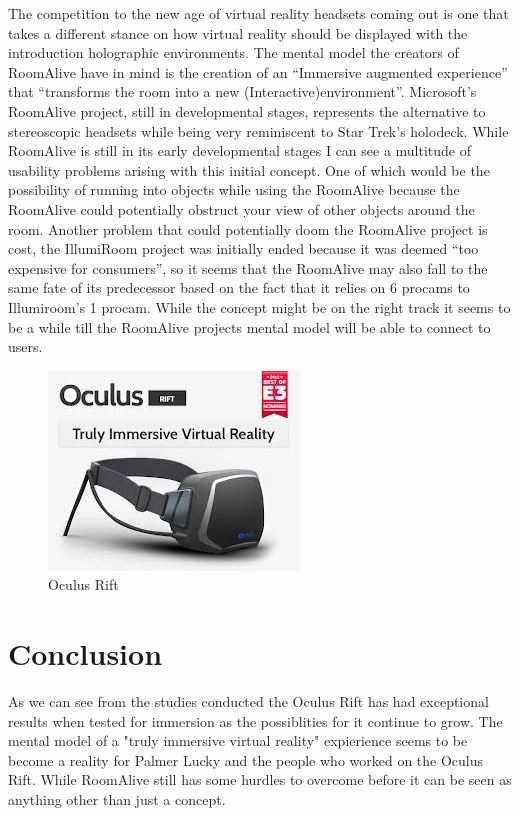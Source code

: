 \documentclass[a4paper]{article}
\begin{document}
\indent The competition to the new age of virtual reality headsets coming out is one that takes a different stance on how virtual reality should be displayed with the introduction holographic environments. The mental model the creators of RoomAlive have in mind is the creation of an “Immersive augmented experience”  that “transforms the room into a new (Interactive)environment”\cite{6}. Microsoft’s RoomAlive project, still in developmental stages, represents the alternative to stereoscopic headsets while being very reminiscent to Star Trek’s holodeck. While RoomAlive is still in its early developmental stages I can see a multitude of usability problems arising with this initial concept. One of which would be the possibility of running into objects while using the RoomAlive because the RoomAlive could potentially obstruct your view of other objects around the room. Another problem that could potentially doom the RoomAlive project is cost, the IllumiRoom project was initially ended because it was deemed “too expensive for consumers”\cite{6}, so it seems that the RoomAlive may also fall to the same fate of its predecessor based on the fact that it relies on 6 procams to Illumiroom's 1 procam. While the concept might be on the right track it seems to be a while till the RoomAlive projects mental model will be able to connect to users.


\begin{figure}
\centering
\includegraphics[scale=0.4]{OculusRift.jpg}
\caption{Oculus Rift}
\end{figure}





\section{Conclusion}

\indent \indent As we can see from the studies conducted the Oculus Rift has had exceptional results when tested for immersion as the possiblities for it continue to grow. The mental model of a "truly immersive virtual reality"\cite{3} expierience seems to be become a reality for Palmer Lucky and the people who worked on the Oculus Rift. While RoomAlive still has some hurdles to overcome before it can be seen as anything other than just a concept. 
\end{document}
